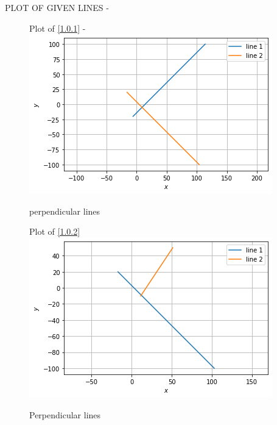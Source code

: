 \documentclass[journal,12pt,twocolumn]{IEEEtran}
\begin{document}
\begin{enumerate}
PLOT OF GIVEN LINES -
\begin{figure}[ht!]
Plot of \eqref{1.0.1} -
    \centering
    \includegraphics[width=\columnwidth]{figure1.png}
    \caption{perpendicular lines}
    \label{fig:perpendicular lines.}
\end{figure} 
\begin{figure}[!ht]
Plot of \eqref{1.0.2} 
    \centering
   \includegraphics[width=\columnwidth]{figure2.png}
    \caption{Perpendicular lines}
    \label{fig: Perpendicular lines.}
\end{figure}    
\end{enumerate}
\end{document}
